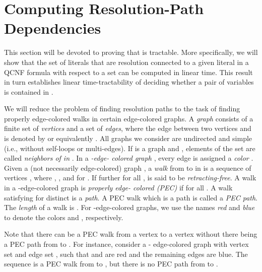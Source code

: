 \documentclass{llncs}
\def\hy{\hbox{-}\nobreak\hskip0pt} \newcommand{\ellipsis}{}
\begin{document}
\section{Computing Resolution\hy Path Dependencies} \label{sec:tractability}
This section will be devoted to proving that  is tractable. More
specifically, we will show that the set of literals that are resolution
connected to a given literal in a QCNF formula  with respect to a set  can be computed in linear time. This result in
turn establishes linear time\hy tractability of deciding whether a pair of
variables is contained in .

We will reduce the problem of finding resolution paths to the task of finding
properly edge\hy colored walks in certain edge\hy colored graphs. A
\emph{graph}  consists of a finite set  of \emph{vertices} and a set
 of \emph{edges}, where the edge between two vertices  and  is
denoted by  or equivalently . All graphs we consider are undirected
and simple (i.e., without self\hy loops or multi\hy edges). If  is a graph
and , elements of the set  are called \emph{neighbors of  in }. In a \emph{\hy edge\hy
  colored graph} , every edge  is assigned a \emph{color}
. Given a (not necessarily edge\hy colored)
graph , a \emph{walk} from  to  in  is a sequence of vertices , where , , and 
for . If further  for all ,  is said to be \emph{retracting\hy free}. A walk  in a \hy edge\hy colored graph  is \emph{properly edge\hy
  colored (PEC)} if  for all
. A walk  satisfying 
for distinct  is a \emph{path}. A PEC walk which is a
path is called a \emph{PEC path}. The \emph{length} of a
walk  is . For \hy edge\hy colored graphs, we use the
names \emph{red} and \emph{blue} to denote the colors  and ,
respectively.

Note that there can be a PEC walk from a vertex  to a vertex  without
there being a PEC path from  to . For instance, consider a \hy
edge\hy colored graph with vertex set  and edge set
, such that  and  are red and the remaining edges
are blue. The sequence  is a PEC walk from  to , but there
is no PEC path from  to .
\end{document}
